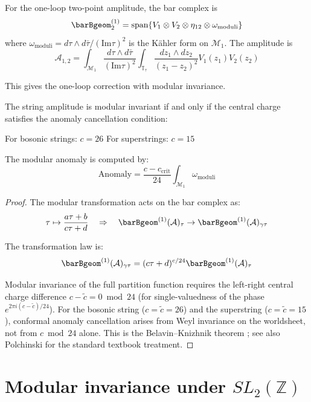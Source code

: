 \begin{example}
For the one-loop two-point amplitude, the bar complex is
\[\barBgeom^{(1)}_2 = \text{span}\{V_1 \otimes V_2 \otimes \eta_{12} \otimes \omega_{\text{moduli}}\}\]
where $\omega_{\text{moduli}} = d\tau \wedge d\bar{\tau}/(\text{Im}\tau)^2$ is the K\"ahler form on $\mathcal{M}_1$.
The amplitude is
\[\mathcal{A}_{1,2} = \int_{\mathcal{M}_1} \frac{d\tau \wedge d\bar{\tau}}{(\text{Im}\tau)^2} \int_{\mathbb{T}_\tau} \frac{dz_1 \wedge dz_2}{(z_1-z_2)^2} V_1(z_1) V_2(z_2)\]

This gives the one-loop correction with modular invariance.
\end{example}

\begin{theorem}\label{thm:modular-anomaly}
The string amplitude is modular invariant if and only if the central charge satisfies the anomaly cancellation condition:

For bosonic strings: $c = 26$
For superstrings: $c = 15$

The modular anomaly is computed by:
\[\text{Anomaly} = \frac{c - c_{\text{crit}}}{24} \int_{\mathcal{M}_1} \omega_{\text{moduli}}\]
\end{theorem}

\begin{proof}
The modular transformation acts on the bar complex as:
\[\tau \mapsto \frac{a\tau + b}{c\tau + d} \quad \Rightarrow \quad \barBgeom^{(1)}(\mathcal{A})_\tau \to \barBgeom^{(1)}(\mathcal{A})_{\gamma\tau}\]

The transformation law is:
\[\barBgeom^{(1)}(\mathcal{A})_{\gamma\tau} = (c\tau + d)^{c/24} \barBgeom^{(1)}(\mathcal{A})_\tau\]

Modular invariance of the full partition function requires the left-right central charge difference $c - \tilde{c} = 0 \bmod 24$ (for single-valuedness of the phase $e^{2\pi i (c-\tilde{c})/24}$). For the bosonic string ($c = \tilde{c} = 26$) and the superstring ($c = \tilde{c} = 15$), conformal anomaly cancellation arises from Weyl invariance on the worldsheet, not from $c \bmod 24$ alone. This is the Belavin--Knizhnik theorem \cite{BK86}; see also Polchinski \cite[Ch.~5]{Pol98} for the standard textbook treatment.
\end{proof}

\section{\texorpdfstring{Modular invariance under $SL_2(\mathbb{Z})$}{Modular invariance under SL-2(Z)}}

